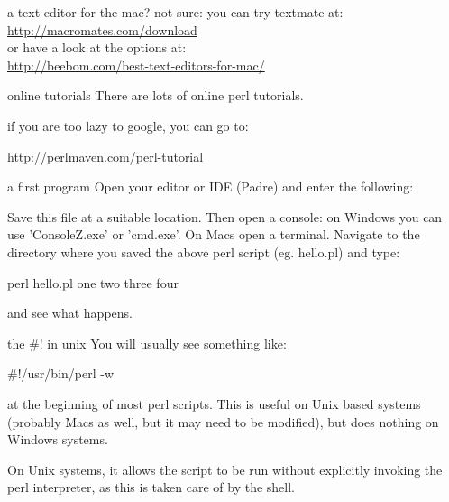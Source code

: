 \documentclass[pdf]{beamer}
\begin{document}
\begin{frame}{a text editor for the mac?}
  not sure: you can try textmate at:\\
  \url{http://macromates.com/download}\\

  or have a look at the options at:\\
  \url{http://beebom.com/best-text-editors-for-mac/}
\end{frame}

\begin{frame}{online tutorials}
  There are lots of online perl tutorials.

  if you are too lazy to google, you can go to:

  http://perlmaven.com/perl-tutorial

\end{frame}

\begin{frame}[fragile]{a first program}
  Open your editor or IDE (Padre) and enter the following:


  Save this file at a suitable location. Then open a console: on Windows you
  can use 'ConsoleZ.exe' or 'cmd.exe'. On Macs open a terminal. Navigate to
  the directory where you saved the above perl script (eg. hello.pl) and type:

  \begin{consolecode}
    perl hello.pl one two three four
  \end{consolecode}

  and see what happens.
\end{frame}

\begin{frame}[fragile]{the \#! in unix}
  You will usually see something like:
 
  \begin{perlcode}
    #!/usr/bin/perl -w
  \end{perlcode}

  at the beginning of most perl scripts. This is useful on Unix based systems
  (probably Macs as well, but it may need to be modified), but does nothing on
  Windows systems.

  On Unix systems, it allows the script to be run without explicitly invoking
  the perl interpreter, as this is taken care of by the shell.
\end{frame}
\end{document}
